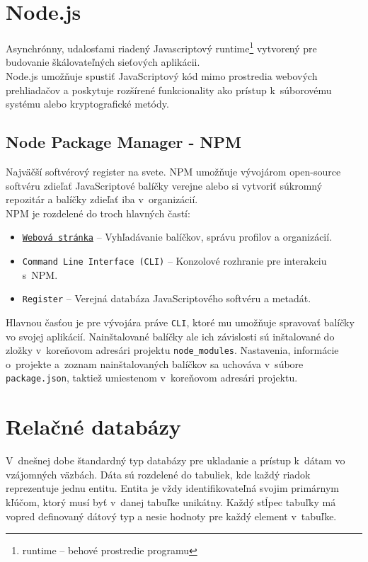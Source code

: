 \section{Node.js}
\label{theory:nodejs}
Asynchrónny, udalosťami riadený Javascriptový runtime\footnote{runtime -- behové prostredie programu} vytvorený pre budovanie škálovateľných sieťových aplikácii. \cite{NodeJS} \\

\noindent Node.js umožňuje spustiť JavaScriptový kód mimo prostredia webových prehliadačov a poskytuje rozšírené funkcionality ako prístup k~súborovému systému alebo kryptografické metódy.

\subsection{Node Package Manager - NPM}
Najväčší softvérový register na svete. NPM umožňuje vývojárom open-source softvéru zdieľať JavaScriptové balíčky verejne alebo si vytvoriť súkromný repozitár a balíčky zdieľať iba v~organizácií. \cite{NPM} \\

\noindent NPM je rozdelené do troch hlavných častí:
\begin{itemize}
	\item \texttt{\href{https://npmjs.com/}{Webová stránka}} -- Vyhľadávanie balíčkov, správu profilov a organizácií. \cite{NPM}
	\item \texttt{Command Line Interface (CLI)} -- Konzolové rozhranie pre interakciu s~NPM. \cite{NPM}
	\item \texttt{Register} -- Verejná databáza JavaScriptového softvéru a metadát. \cite{NPM}
\end{itemize}

\noindent Hlavnou časťou je pre vývojára práve \texttt{CLI}, ktoré mu umožňuje spravovať balíčky vo svojej aplikácií. Nainštalované balíčky ale ich závislosti sú inštalované do zložky v~koreňovom adresári projektu \texttt{node\_modules}. Nastavenia, informácie o~projekte a~zoznam nainštalovaných balíčkov sa uchováva v~súbore \texttt{package.json}, taktiež umiestenom v~koreňovom adresári projektu.

\section{Relačné databázy}
\label{theory:databases}
V~dnešnej dobe štandardný typ databázy pre ukladanie a prístup k~dátam vo vzájomných väzbách. Dáta sú rozdelené do tabuliek, kde každý riadok reprezentuje jednu entitu. Entita je vždy identifikovateľná svojim primárnym kľúčom, ktorý musí byť v~danej tabuľke unikátny. Každý stĺpec tabuľky má vopred definovaný dátový typ a nesie hodnoty pre každý element v~tabuľke. \\

